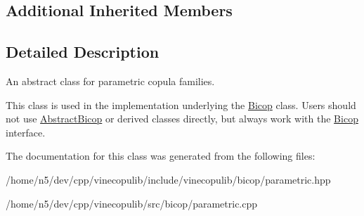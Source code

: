 \subsection*{Additional Inherited Members}


\subsection{Detailed Description}
An abstract class for parametric copula families. 

This class is used in the implementation underlying the \hyperlink{classvinecopulib_1_1_bicop}{Bicop} class. Users should not use \hyperlink{classvinecopulib_1_1_abstract_bicop}{Abstract\+Bicop} or derived classes directly, but always work with the \hyperlink{classvinecopulib_1_1_bicop}{Bicop} interface. 

The documentation for this class was generated from the following files\+:\begin{DoxyCompactItemize}
\item 
/home/n5/dev/cpp/vinecopulib/include/vinecopulib/bicop/parametric.\+hpp\item 
/home/n5/dev/cpp/vinecopulib/src/bicop/parametric.\+cpp\end{DoxyCompactItemize}
